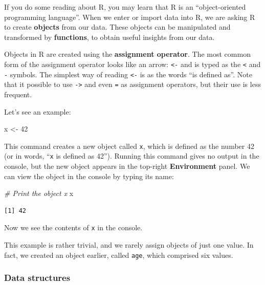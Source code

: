 \documentclass[
  a4paper,
]{memoir}
\newenvironment{Shaded}{\begin{snugshade}}{\end{snugshade}}
\newcommand{\CommentTok}[1]{\textcolor[rgb]{0.00,0.00,0.00}{\textit{#1}}}
\newcommand{\DecValTok}[1]{\textcolor[rgb]{0.00,0.00,0.00}{#1}}
\newcommand{\NormalTok}[1]{\textcolor[rgb]{0.00,0.00,0.00}{#1}}
\newcommand{\OtherTok}[1]{\textcolor[rgb]{0.00,0.00,0.00}{#1}}
\begin{document}
If you do some reading about R, you may learn that R is an
``object-oriented programming language''. When we enter or import data
into R, we are asking R to create \textbf{objects} from our data. These
objects can be manipulated and transformed by \textbf{functions}, to
obtain useful insights from our data.

Objects in R are created using the \textbf{assignment operator}. The
most common form of the assignment operator looks like an arrow:
\texttt{\textless{}-} and is typed as the \texttt{\textless{}} and
\texttt{-} symbols. The simplest way of reading \texttt{\textless{}-} is
as the words ``is defined as''. Note that it possible to use
\texttt{-\textgreater{}} and even \texttt{=} as assignment operators,
but their use is less frequent.

Let's see an example:

\begin{Shaded}
\begin{Highlighting}[]
\NormalTok{x }\OtherTok{\textless{}{-}} \DecValTok{42}
\end{Highlighting}
\end{Shaded}

This command creates a new object called \texttt{x}, which is defined as
the number 42 (or in words, ``\texttt{x} is defined as 42''). Running
this command gives no output in the console, but the new object appears
in the top-right \textbf{Environment} panel. We can view the object in
the console by typing its name:

\begin{Shaded}
\begin{Highlighting}[]
\CommentTok{\# Print the object x}
\NormalTok{x}
\end{Highlighting}
\end{Shaded}

\begin{verbatim}
[1] 42
\end{verbatim}

Now we see the contents of \texttt{x} in the console.

This example is rather trivial, and we rarely assign objects of just one
value. In fact, we created an object earlier, called \texttt{age}, which
comprised six values.

\hypertarget{sec-data-structures}{%
\subsubsection{Data structures}\label{sec-data-structures}}
\end{document}
